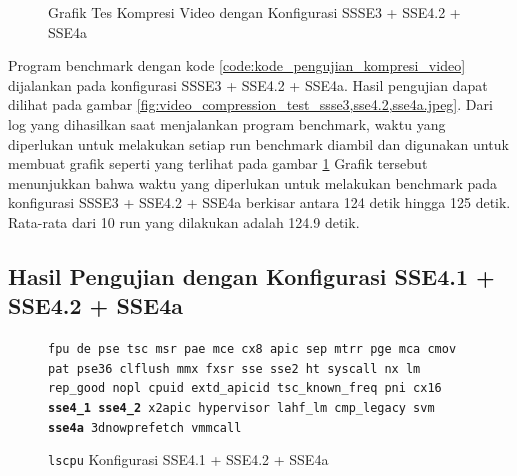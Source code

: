 \begin{figure}
    \centering
    \caption{Grafik Tes Kompresi Video dengan Konfigurasi SSSE3 + SSE4.2 + SSE4a}
    \label{fig:video_compression_test_ssse3,sse4.2,sse4a_graph}
\end{figure}

Program benchmark dengan kode \ref{code:kode_pengujian_kompresi_video} dijalankan pada konfigurasi SSSE3 + SSE4.2 + SSE4a. Hasil pengujian dapat dilihat pada gambar \ref{fig:video_compression_test_ssse3,sse4.2,sse4a.jpeg}. Dari log yang dihasilkan saat menjalankan program benchmark, waktu yang diperlukan untuk melakukan setiap run benchmark diambil dan digunakan untuk membuat grafik seperti yang terlihat pada gambar \ref{fig:video_compression_test_ssse3,sse4.2,sse4a_graph} Grafik tersebut menunjukkan bahwa waktu yang diperlukan untuk melakukan benchmark pada konfigurasi SSSE3 + SSE4.2 + SSE4a berkisar antara 124 detik hingga 125 detik. Rata-rata dari 10 run yang dilakukan adalah 124.9 detik.
\subsection{Hasil Pengujian dengan Konfigurasi SSE4.1 + SSE4.2 + SSE4a}
\begin{figure}
    \texttt{fpu de pse tsc msr pae mce cx8 apic sep mtrr pge mca cmov pat pse36 clflush mmx fxsr sse sse2 ht syscall nx lm rep\_good nopl cpuid extd\_apicid tsc\_known\_freq pni cx16 \textbf{sse4\_1} \textbf{sse4\_2} x2apic hypervisor lahf\_lm cmp\_legacy svm \textbf{sse4a} 3dnowprefetch vmmcall}
    \caption{\texttt{lscpu} Konfigurasi SSE4.1 + SSE4.2 + SSE4a}
    \label{fig:lscpu_video_compression_test_sse4.1,sse4.2,sse4a.jpeg}
\end{figure}

